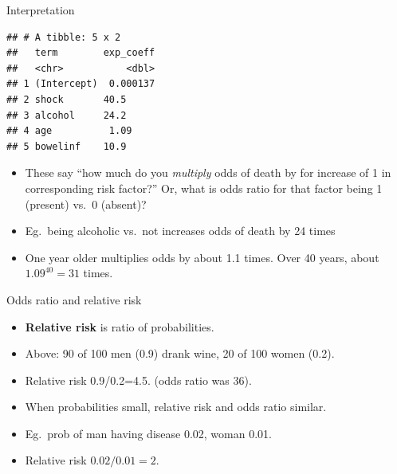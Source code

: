 \documentclass[ignorenonframetext,]{beamer}
\begin{document}
\begin{frame}[fragile]{Interpretation}
\protect\hypertarget{interpretation}{}

\small

\begin{verbatim}
## # A tibble: 5 x 2
##   term        exp_coeff
##   <chr>           <dbl>
## 1 (Intercept)  0.000137
## 2 shock       40.5     
## 3 alcohol     24.2     
## 4 age          1.09    
## 5 bowelinf    10.9
\end{verbatim}

\normalsize

\begin{itemize}
\item
  These say ``how much do you \emph{multiply} odds of death by for
  increase of 1 in corresponding risk factor?'' Or, what is odds ratio
  for that factor being 1 (present) vs.~0 (absent)?
\item
  Eg.~being alcoholic vs.~not increases odds of death by 24 times
\item
  One year older multiplies odds by about 1.1 times. Over 40 years,
  about \(1.09^{40}=31\) times.
\end{itemize}

\end{frame}

\begin{frame}{Odds ratio and relative risk}
\protect\hypertarget{odds-ratio-and-relative-risk}{}

\begin{itemize}
\item
  \textbf{Relative risk} is ratio of probabilities.
\item
  Above: 90 of 100 men (0.9) drank wine, 20 of 100 women (0.2).
\item
  Relative risk 0.9/0.2=4.5. (odds ratio was 36).
\item
  When probabilities small, relative risk and odds ratio similar.
\item
  Eg.~prob of man having disease 0.02, woman 0.01.
\item
  Relative risk \(0.02/0.01=2\).
\end{itemize}

\end{frame}
\end{document}
